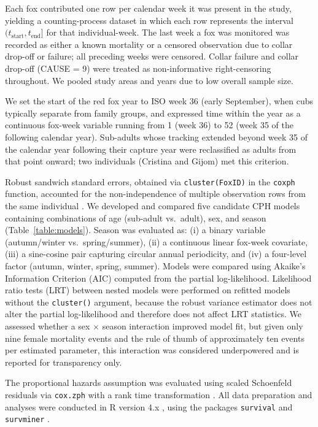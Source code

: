 Each fox contributed one row per calendar week it was present in the study,
yielding a counting-process dataset in which each row represents the interval
$(t_{\text{start}}, t_{\text{end}}]$ for that individual-week. The last week a
fox was monitored was recorded as either a known mortality or a censored
observation due to collar drop-off or failure; all preceding weeks were
censored. Collar failure and collar drop-off (CAUSE = 9) were treated as
non-informative right-censoring throughout. We pooled study areas and years due
to low overall sample size.

We set the start of the red fox year to ISO week 36 (early September), when
cubs typically separate from family groups, and expressed time within the year
as a continuous fox-week variable running from 1 (week 36) to 52 (week 35 of
the following calendar year). Sub-adults whose tracking extended beyond week 35
of the calendar year following their capture year were reclassified as adults
from that point onward; two individuals (Cristina and Gijom) met this criterion.

Robust sandwich standard errors, obtained via \texttt{cluster(FoxID)} in the
\texttt{coxph} function, accounted for the non-independence of multiple
observation rows from the same individual
\citep{therneauPackageSurvivalAnalysis2024}. We developed and compared five
candidate CPH models containing combinations of age (sub-adult vs.\ adult),
sex, and season (Table~\ref{table:models}). Season was evaluated as: (i) a
binary variable (autumn/winter vs.\ spring/summer), (ii) a continuous linear
fox-week covariate, (iii) a sine-cosine pair capturing circular annual
periodicity, and (iv) a four-level factor (autumn, winter, spring, summer).
Models were compared using Akaike's Information Criterion (AIC) computed from
the partial log-likelihood. Likelihood ratio tests (LRT) between nested models
were performed on refitted models without the \texttt{cluster()} argument,
because the robust variance estimator does not alter the partial log-likelihood
and therefore does not affect LRT statistics. We assessed whether a sex
$\times$ season interaction improved model fit, but given only nine female
mortality events and the rule of thumb of approximately ten events per
estimated parameter, this interaction was considered underpowered and is
reported for transparency only.

The proportional hazards assumption was evaluated using scaled Schoenfeld
residuals via \texttt{cox.zph} with a rank time transformation
\citep{therneauPackageSurvivalAnalysis2024}. All data preparation and analyses
were conducted in R version 4.x \citep{rcoreteamLanguageEnvironmentStatistical2024},
using the packages \texttt{survival}
\citep{therneauPackageSurvivalAnalysis2024} and \texttt{survminer}
\citep{kassambaraSurvminerDrawingSurvival2024}.

